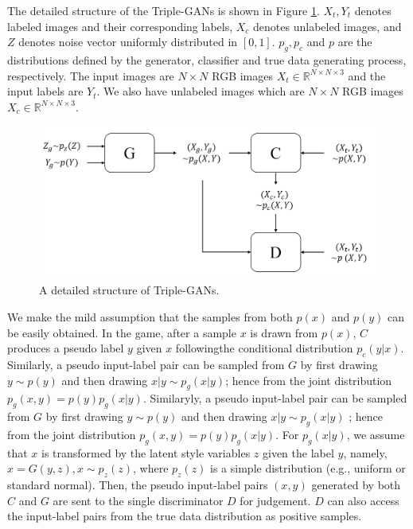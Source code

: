 \documentclass[conference]{IEEEtran}
\begin{document}
The detailed structure of the Triple-GANs is shown in Figure \ref{f4}. $X_t, Y_t$ denotes labeled images and their corresponding labels, $X_c$ denotes unlabeled images, and $Z$ denotes noise vector uniformly distributed in $[0, 1]$. $p_g, p_c$ and $p$ are the distributions defined by the generator, classifier and true data generating process, respectively. The input images are $N \times N$ RGB images $X_t \in \mathbb{R}^{N \times N \times 3}$ and the input labels are $Y_t$. We also have unlabeled images which are $N \times N$ RGB images $X_c \in \mathbb{R}^{N \times N \times 3}$. 

\begin{figure}
\centering
\includegraphics[scale=0.35]{pics/4.png}
\caption{A detailed structure of Triple-GANs.}
\label{f4}
\end{figure}

We make the mild assumption that the samples from both $p(x)$ and $p(y)$ can be easily obtained. In the game, after a sample $x$ is drawn from $p(x)$, $C$ produces a pseudo label $y$ given $x$ followingthe conditional distribution $p_c(y|x)$. Similarly, a pseudo input-label pair can be sampled from $G$ by first drawing $y \sim p(y)$ and then drawing $x|y  \sim  p_g(x|y)$; hence from the joint distribution $p_g(x, y) = p(y) p_g(x|y)$. Similaryly, a pseudo input-label pair can be sampled from $G$ by first drawing $y \sim p(y)$ and then drawing $x|y \sim p_g(x|y)$ ; hence from the joint distribution $p_g(x, y) = p(y) p_g(x|y)$. For $p_g(x|y)$, we assume that $x$ is transformed by the latent style variables $z$ given the label $y$, namely, $x = G(y, z), x \sim p_z(z)$, where $p_z(z)$ is a simple distribution (e.g., uniform or standard normal). Then, the pseudo input-label pairs $(x, y)$ generated by both $C$ and $G$ are sent to the single discriminator $D$ for judgement. $D$ can also access the input-label pairs from the true data distribution as positive samples. 
\end{document}
